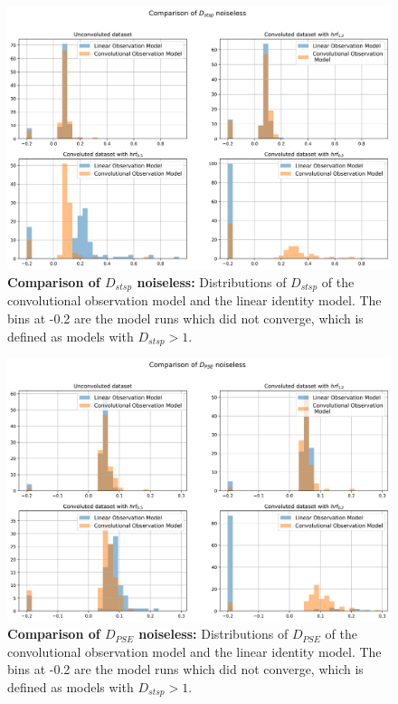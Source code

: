 \begin{figure}
    \includegraphics[width=\textwidth]{Images/Comparison_D_stsp_noiseless.png}
    \caption[Comparison of $D_{stsp}$ noiseless]{\textbf{Comparison of $D_{stsp}$ noiseless: } Distributions of $D_{stsp}$ of the convolutional observation model
    and the linear identity model. The bins at -0.2 are the model runs which did not converge, which is defined as models with $D_{stsp}>1$.}
    \label{fig:Comparison_D_stsp_noiseless}
\end{figure}

\begin{figure}
    \includegraphics[width=\textwidth]{Images/Comparison_D_PSE_noiseless.png}
    \caption[Comparison of $D_{PSE}$ noiseless]{\textbf{Comparison of $D_{PSE}$ noiseless: } Distributions of $D_{PSE}$ of the convolutional observation model
    and the linear identity model. The bins at -0.2 are the model runs which did not converge, which is defined as models with $D_{stsp}>1$.}
    \label{fig:Comparison_D_PSE_noiseless}
\end{figure}


